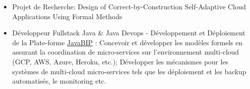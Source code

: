 \documentclass[10pt,a4paper,ragged2e]{altacv}
\begin{document}
	
	
	
	
	\begin{fullwidth}
		\makecvheader
	\end{fullwidth}
	
	
	
	\begin{itemize}
		\item Projet de Recherche: Design of Correct-by-Construction Self-Adaptive Cloud Applications Using Formal Methods
		
		\item Développeur Fullstack Java \& Java Devops - Développement et Déploiement de la Plate-forme \href{https://github.com/sbliudze/javabip-core}{JavaBIP} : 
		Concevoir et développer les modèles formels en assurant la coordination de micro-services sur l'environnement multi-cloud (GCP, AWS, Azure, Heroku, etc.); Développer les mécanismes pour les systèmes de multi-cloud micro-services tels que les déploiement et les backup automatisés, le monitoring etc.  
	\end{itemize}
	
\end{document}
